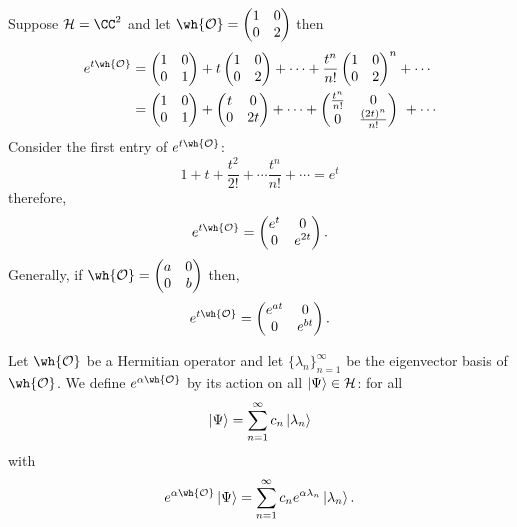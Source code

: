 \documentclass[12pt, a4paper]{article}
\begin{document}
\begin{mdexample}
    Suppose \(\mathcal{H}=\CC^2\) and let \(\wh{\mathcal{O}} = \begin{pmatrix} 1 & 0 \\ 0 & 2\end{pmatrix}\) then 
    \[\begin{aligned}
        e^{t\wh{\mathcal{O}}} &= \begin{pmatrix} 1 & 0 \\ 0 & 1\end{pmatrix} + t\begin{pmatrix} 1 & 0 \\ 0 & 2\end{pmatrix} +\cdots + \frac{t^n}{n!}\begin{pmatrix} 1 & 0 \\ 0 & 2\end{pmatrix}^n +\cdots \\
        &= \begin{pmatrix} 1 & 0 \\ 0 & 1\end{pmatrix} + \begin{pmatrix} t & 0 \\ 0 & 2t\end{pmatrix} +\cdots + \begin{pmatrix} \frac{t^n}{n!} & 0 \\ 0 & \frac{(2t)^n}{n!}\end{pmatrix}\ +\cdots
    \end{aligned}\]
    Consider the first entry of \(e^{t\wh{\mathcal{O}}}\):
    \[1+t+\frac{t^2}{2!} +\cdots \frac{t^n}{n!}+\cdots = e^t\]
    therefore,
    \[e^{t\wh{\mathcal{O}}} =\begin{pmatrix} e^t & 0 \\ 0 & e^{2t}\end{pmatrix}.\]
    Generally, if \(\wh{\mathcal{O}} = \begin{pmatrix} a & 0 \\ 0 & b\end{pmatrix}\) then,
    \[e^{t\wh{\mathcal{O}}} = \begin{pmatrix} e^{at} & 0 \\ 0 & e^{bt} \end{pmatrix}.\]
\end{mdexample}

\begin{mdthm}
    Let \(\wh{\mathcal{O}}\) be a Hermitian operator and let \(\{\lambda_n\}_{n=1}^{\infty}\) be the eigenvector basis of \(\wh{\mathcal{O}}\). We define \(e^{\alpha \wh{\mathcal{O}}}\) by its action on all \(\ket{\Psi} \in \mathcal{H}\): for all 
    \[\ket{\Psi} = \sum_{n=1}^{\infty} c_n \ket{\lambda_n}\]
    with 
    \[e^{\alpha \wh{\mathcal{O}}} \ket{\Psi} = \sum_{n=1}^{\infty} c_n e^{\alpha \lambda_n} \ket{\lambda_n}.\]
\end{mdthm}
\end{document}
